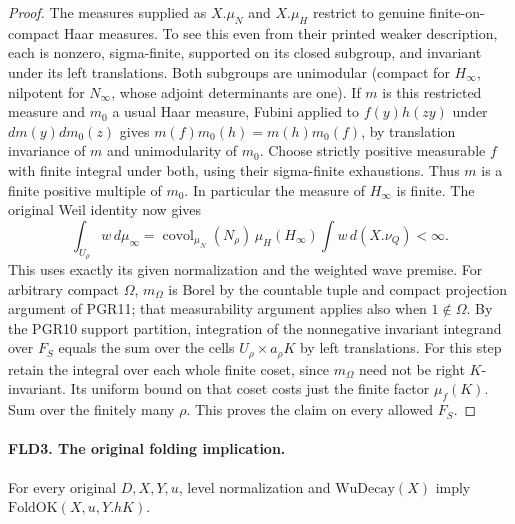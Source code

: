 \begin{proof}
The measures supplied as $X.\mu_N$ and $X.\mu_H$ restrict to genuine
finite-on-compact Haar measures. To see this even from their printed
weaker description, each is nonzero, sigma-finite, supported on its
closed subgroup, and invariant under its left translations. Both
subgroups are unimodular (compact for $H_\infty$, nilpotent for
$N_\infty$, whose adjoint determinants are one). If $m$ is this
restricted measure and $m_0$ a usual Haar measure, Fubini applied to
$f(y)h(zy)$ under $dm(y)dm_0(z)$ gives
$m(f)m_0(h)=m(h)m_0(f)$, by translation invariance of $m$ and
unimodularity of $m_0$. Choose strictly positive measurable $f$
with finite integral under both, using their sigma-finite exhaustions.
Thus $m$ is a finite positive multiple of $m_0$. In particular the
measure of $H_\infty$ is finite. The original Weil identity now gives
\[
 \int_{U_\rho}w\,d\mu_\infty
   =\operatorname{covol}_{\mu_N}(N_\rho)\,
             \mu_H(H_\infty)\int w\,d(X.\nu_Q)<\infty .
\]
This uses exactly its given normalization and the weighted wave premise.
For arbitrary compact $\Omega$, $m_\Omega$ is Borel by the countable
tuple and compact projection argument of PGR11; that measurability
argument applies also when $1\notin\Omega$. By the PGR10 support
partition, integration of the nonnegative
invariant integrand over $F_S$ equals the sum over the cells
$U_\rho\times a_\rho K$ by left translations. For this step retain
the integral over each whole finite coset, since $m_\Omega$ need
not be right $K$-invariant. Its uniform bound on that coset costs
just the finite factor $\mu_f(K)$. Sum over the finitely many $\rho$.
This proves the claim on every allowed $F_S$.
\end{proof}

\paragraph{FLD3. The original folding implication.}
\label{claim:FLD3}
For every original $D,X,Y,u$, level normalization and
$\mathrm{WuDecay}(X)$ imply $\mathrm{FoldOK}(X,u,Y.hK)$.

